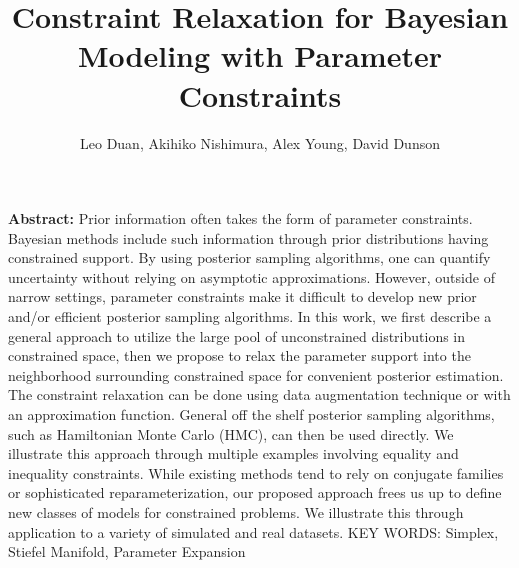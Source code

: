 \documentclass[10pt,fleqn]{article}
\title{\textbf{Constraint Relaxation for Bayesian Modeling with Parameter Constraints}}
\author{Leo Duan, Akihiko Nishimura,  Alex Young,  David Dunson}
\date{}
\DeclareMathOperator{\1}{\mathbbm{1}}
\begin{document}
\maketitle
{\bf Abstract:} Prior information often takes  the form of parameter constraints. Bayesian methods include such information through prior distributions having constrained support. By using posterior sampling algorithms, one can quantify uncertainty without relying on asymptotic approximations. However, outside of narrow settings, parameter constraints
make it difficult to develop new  prior and/or   efficient posterior sampling algorithms. In this work, we first describe a general approach to utilize
the large pool of unconstrained distributions in constrained space,  then we propose to relax the parameter support  into the neighborhood surrounding constrained
space for convenient posterior estimation. The constraint relaxation can
be done using data augmentation technique or    with an approximation function. General off the shelf posterior sampling algorithms, such as Hamiltonian Monte Carlo (HMC), can then be used directly. We illustrate this approach through multiple examples involving equality and inequality constraints. While existing methods tend to rely on conjugate families or sophisticated reparameterization, our proposed approach frees us up to define new classes of  models for constrained problems. We illustrate this through application to a variety of simulated and real datasets.
\vskip 12pt
{\noindent KEY WORDS: Simplex,  Stiefel Manifold, Parameter Expansion}
{}
\end{document}
